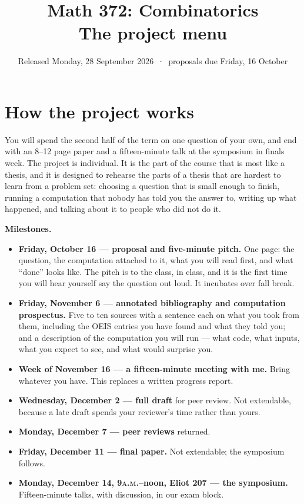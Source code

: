 \documentclass[11pt]{amsart}
\title{Math 372: Combinatorics\\ The project menu}
\author{Released Monday, 28 September 2026 \,·\, proposals due Friday, 16 October}
\begin{document}
\maketitle

\section*{How the project works}

You will spend the second half of the term on one question of your own, and end with an
8--12 page paper and a fifteen-minute talk at the symposium in finals week. The project is
individual. It is the part of the course that is most like a thesis, and it is designed to
rehearse the parts of a thesis that are hardest to learn from a problem set: choosing a
question that is small enough to finish, running a computation that nobody has told you the
answer to, writing up what happened, and talking about it to people who did not do it.

\medskip\noindent\textbf{Milestones.}
\begin{itemize}
\item \textbf{Friday, October 16 --- proposal and five-minute pitch.} One page: the question,
the computation attached to it, what you will read first, and what ``done'' looks like. The
pitch is to the class, in class, and it is the first time you will hear yourself say the
question out loud. It incubates over fall break.
\item \textbf{Friday, November 6 --- annotated bibliography and computation prospectus.} Five
to ten sources with a sentence each on what you took from them, including the OEIS entries you
have found and what they told you; and a description of the computation you will run ---
what code, what inputs, what you expect to see, and what would surprise you.
\item \textbf{Week of November 16 --- a fifteen-minute meeting with me.} Bring whatever you
have. This replaces a written progress report.
\item \textbf{Wednesday, December 2 --- full draft} for peer review. Not extendable, because
a late draft spends your reviewer's time rather than yours.
\item \textbf{Monday, December 7 --- peer reviews} returned.
\item \textbf{Friday, December 11 --- final paper.} Not extendable; the symposium follows.
\item \textbf{Monday, December 14, 9\textsc{a.m.}--noon, Eliot 207 --- the symposium.}
Fifteen-minute talks, with discussion, in our exam block.
\end{itemize}
\end{document}
